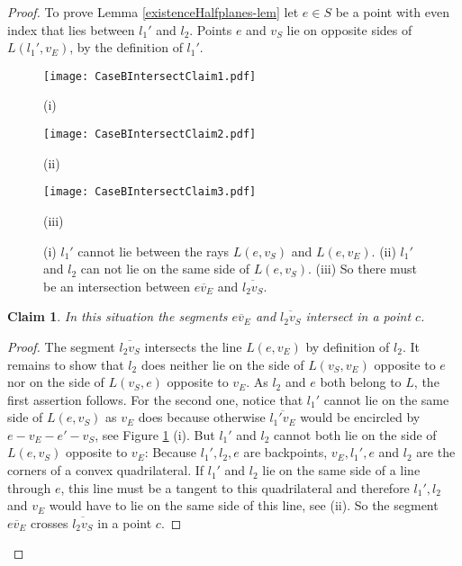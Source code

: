 \documentclass[11pt]{article}
\newtheorem{claim}{Claim}
\begin{document}
 
\begin{proof}
To prove Lemma \ref{existenceHalfplanes-lem} let $e\in S$ be a point with even index that lies between $l_1'$ and $l_2$. Points $e$ and $v_S$ lie on opposite sides of $L(l_1',v_E)$, by the definition of $l_1'$.

\begin{figure}[hbtp]\begin{minipage}[t]{0.30\textwidth}
\begin{center}\texttt{[image: CaseBIntersectClaim1.pdf]}

(i)
\end{center}\end{minipage}
\hfill
\begin{minipage}[t]{0.23\textwidth}
\begin{center}\texttt{[image: CaseBIntersectClaim2.pdf]}

(ii)
\end{center}\end{minipage}
\hfill
\begin{minipage}[t]{0.28\textwidth}
\begin{center}\texttt{[image: CaseBIntersectClaim3.pdf]}

(iii)
\end{center}\end{minipage}
\caption{(i) $l_1'$ cannot lie between the rays $L(e,v_S)$ and $L(e,v_E)$. 
(ii) $l_1'$ and $l_2$ can not lie on the same side of $L(e,v_S)$.
(iii) So there must be an intersection between $\overline{ev_E}$ and $\overline{l_2v_S}$.}
\label{CaseBIntersectClaim-fig}
\end{figure}

\begin{claim}In this situation the segments $\overline{ev_E}$ and $\overline{l_2v_S}$ intersect in a point $c$. 
\end{claim}

\begin{proof}The segment $\overline{l_2v_S}$ intersects the line $L(e,v_E)$ by definition of $l_2$. It remains to show that $l_2$ does neither lie on the side of $L(v_S,v_E)$ opposite to $e$ nor on the side of $L(v_S,e)$ opposite to $v_E$.
As $l_2$ and $e$ both belong to $L$, the first assertion follows.
For the second one, notice that $l_1'$ cannot lie on the same side of $L(e,v_S)$ as $v_E$ does because otherwise  $\overline{l_1'v_E}$ would be encircled by $e-v_E-e'-v_S$, see Figure \ref{CaseBIntersectClaim-fig} (i). But $l_1'$ and $l_2$ cannot both lie on the side of $L(e,v_S)$ opposite to $v_E$: Because $l_1',l_2,e$ are backpoints, $v_E,l_1',e$ and $l_2$ are the corners of a convex quadrilateral. If $l_1'$ and $l_2$ lie on the same side of a line through $e$, this line must be a tangent to this quadrilateral and therefore $l_1',l_2$ and $v_E$ would have to lie on the same side of this line, see (ii).
So the segment $\overline{ev_E}$ crosses $\overline{l_2v_S}$ in a point $c$.
\end{proof}



\end{proof}
\end{document}
